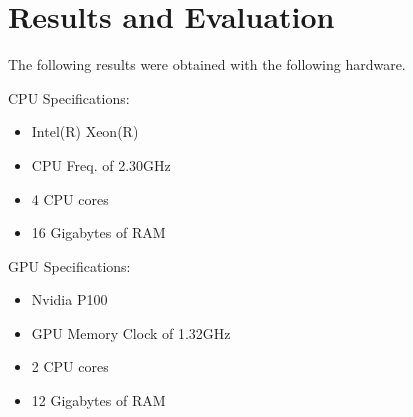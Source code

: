 \section{Results and Evaluation}
The following results were obtained with the following hardware.

\vspace{4mm}
\noindent
\begin{minipage}{0.45\textwidth}
  CPU Specifications:
  \begin{itemize}
    \item Intel(R) Xeon(R)
    \item CPU Freq. of 2.30GHz
    \item 4 CPU cores
    \item 16 Gigabytes of RAM
  \end{itemize}
\end{minipage}
\hfill
\begin{minipage}{0.5\textwidth}
  GPU Specifications:
  \begin{itemize}
    \item Nvidia P100
    \item GPU Memory Clock of 1.32GHz
    \item 2 CPU cores
    \item 12 Gigabytes of RAM
  \end{itemize}
\end{minipage}
\vspace{4mm}

